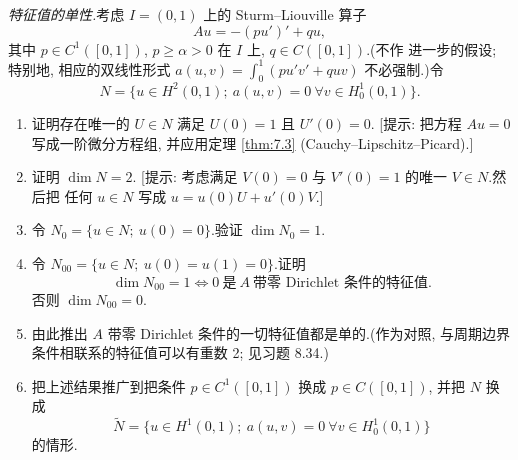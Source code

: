 \begin{exercise}
\label{exer:8.33}
\emph{特征值的单性.}考虑 $I=(0,1)$ 上的 Sturm--Liouville 算子
\begin{equation*}
Au=-(pu')'+qu,
\end{equation*}
其中 $p\in C^1([0,1])$, $p\ge\alpha>0$ 在 $I$ 上, $q\in C([0,1])$.(不作
进一步的假设; 特别地, 相应的双线性形式
$a(u,v)=\int_0^1(pu'v'+quv)$ 不必强制.)令
\begin{equation*}
N=\{u\in H^2(0,1);\ a(u,v)=0\ \forall v\in H_0^1(0,1)\}.
\end{equation*}
\begin{enumerate}[label=\arabic*., leftmargin=2.2em, itemsep=0.3em]
	\item 证明存在唯一的 $U\in N$ 满足 $U(0)=1$ 且 $U'(0)=0$.
	      [提示: 把方程 $Au=0$ 写成一阶微分方程组, 并应用定理  \ref{thm:7.3}
	      (Cauchy--Lipschitz--Picard).]
	\item 证明 $\dim N=2$.
	      [提示: 考虑满足 $V(0)=0$ 与 $V'(0)=1$ 的唯一 $V\in N$.然后把
	      任何 $u\in N$ 写成 $u=u(0)U+u'(0)V$.]
	\item 令 $N_0=\{u\in N;\ u(0)=0\}$.验证 $\dim N_0=1$.
	\item 令 $N_{00}=\{u\in N;\ u(0)=u(1)=0\}$.证明
	      \begin{equation*}
	      \dim N_{00}=1\iff 0\ \text{是}\ A\ \text{带零 Dirichlet 条件的特征值}.
	      \end{equation*}
	      否则 $\dim N_{00}=0$.
	\item 由此推出 $A$ 带零 Dirichlet 条件的一切特征值都是单的.(作为对照,
	      与周期边界条件相联系的特征值可以有重数 2; 见习题 8.34.)
	\item 把上述结果推广到把条件 $p\in C^1([0,1])$ 换成 $p\in C([0,1])$,
	      并把 $N$ 换成
	      \begin{equation*}
	      \tilde N=\{u\in H^1(0,1);\ a(u,v)=0\ \forall v\in H_0^1(0,1)\}
	      \end{equation*}
	      的情形.
\end{enumerate}
\end{exercise}

